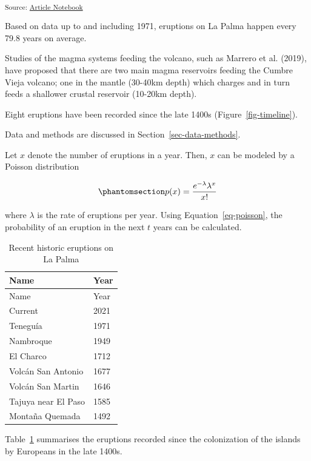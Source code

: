 \documentclass[
]{agujournal2019}
\begin{document}
\textsubscript{Source:
\href{https://EmouAcademy.github.io/my-awesome-manuscripts/index.qmd.html}{Article
Notebook}}

Based on data up to and including 1971, eruptions on La Palma happen
every 79.8 years on average.

Studies of the magma systems feeding the volcano, such as Marrero et al.
(2019), have proposed that there are two main magma reservoirs feeding
the Cumbre Vieja volcano; one in the mantle (30-40km depth) which
charges and in turn feeds a shallower crustal reservoir (10-20km depth).

Eight eruptions have been recorded since the late 1400s
(Figure~\ref{fig-timeline}).

Data and methods are discussed in Section~\ref{sec-data-methods}.

Let \(x\) denote the number of eruptions in a year. Then, \(x\) can be
modeled by a Poisson distribution

\begin{equation}\phantomsection\label{eq-poisson}{
p(x) = \frac{e^{-\lambda} \lambda^{x}}{x !}
}\end{equation}

where \(\lambda\) is the rate of eruptions per year. Using
Equation~\ref{eq-poisson}, the probability of an eruption in the next
\(t\) years can be calculated.

\begin{longtable}[]{@{}ll@{}}
\caption{Recent historic eruptions on La
Palma}\label{tbl-history}\tabularnewline
\toprule\noalign{}
Name & Year \\
\midrule\noalign{}
\endfirsthead
\toprule\noalign{}
Name & Year \\
\midrule\noalign{}
\endhead
\bottomrule\noalign{}
\endlastfoot
Current & 2021 \\
Teneguía & 1971 \\
Nambroque & 1949 \\
El Charco & 1712 \\
Volcán San Antonio & 1677 \\
Volcán San Martin & 1646 \\
Tajuya near El Paso & 1585 \\
Montaña Quemada & 1492 \\
\end{longtable}

Table~\ref{tbl-history} summarises the eruptions recorded since the
colonization of the islands by Europeans in the late 1400s.
\end{document}
